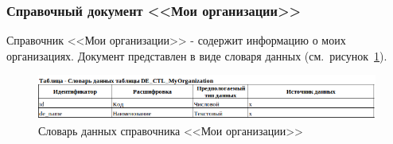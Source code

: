 % 
% 
% 
% 
% 



\subsubsection{Справочный документ <<Мои организации>>}

Справочник <<Мои организации>> - содержит информацию о моих организациях.
Документ представлен в виде словаря данных (см.~рисунок~\ref{fig:InformationalModel_DE_CTL_MyOrganization}).

\begin{figure}[!h]
    \centering
    \includegraphics[width=16cm]
    {assets/InformationalModel/DE_CTL_MyOrganization.png}
    \caption{Словарь данных справочника <<Мои организации>>}
    \label{fig:InformationalModel_DE_CTL_MyOrganization}
\end{figure}


